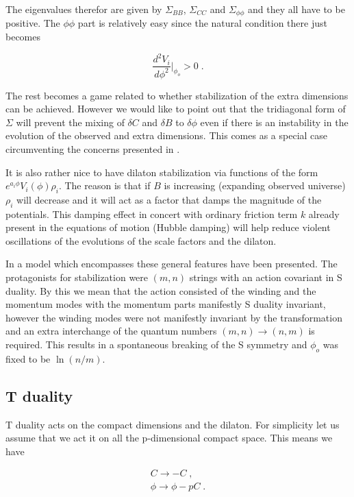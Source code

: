 \documentclass[aps,floatfix,twocolumn,amsmath]{revtex4}
\newcommand{\be}{\begin{equation}}
\newcommand{\ee}{\end{equation}}
\newcommand{\bea}{\begin{eqnarray}}
\newcommand{\eea}{\end{eqnarray}}
\begin{document}
The eigenvalues therefor are given by $\Sigma_{BB}$, $\Sigma_{CC}$ and $\Sigma_{\phi\phi}$ and they all have to be positive. The $\phi\phi$ part is relatively easy since the natural condition there just becomes

\be
\frac{d^{2}V_{i}}{d\phi^{2}}\vert_{\phi_{o}}>0\;.
\ee

The rest becomes a game related to whether stabilization of the extra dimensions can be achieved. However we would like to point out that the tridiagonal form of $\Sigma$ will prevent the mixing of $\delta C$ and $\delta B$ to $\delta\phi$ even if there is an instability in the evolution of the observed and extra dimensions. This comes as a special case circumventing the concerns presented in \cite{d1}. 

It is also rather nice to have dilaton stabilization via functions of the form $e^{a_{i}\phi}V_{i}(\phi)\rho_{i}$. The reason is that if $B$ is increasing (expanding observed universe) $\rho_{i}$ will decrease and it will act as a factor that damps the magnitude of the potentials. This damping effect in concert with ordinary friction term $k$ already present in the equations of motion (Hubble damping) will help reduce violent oscillations of the evolutions of the scale factors and the dilaton.

In \cite{newtr} a model which encompasses these general features have been presented. The protagonists for stabilization were $(m,n)$ strings with an action covariant in S duality. By this we mean that the action consisted of the winding and the momentum modes with the momentum parts manifestly S duality invariant, however the winding modes were not manifestly invariant by the transformation and an extra interchange of the quantum numbers $(m,n)\to(n,m)$ is required. This results in a spontaneous breaking of the S symmetry and $\phi_{o}$ was fixed to be $\ln(n/m)$.

\subsection{T duality}

T duality acts on the compact dimensions and the dilaton. For simplicity let us assume that we act it on all the p-dimensional compact space. This means we have

\begin{subequations}
\bea
C\to-C\;,\\
\phi\to\phi-pC\;.
\eea
\end{subequations}
\end{document}
